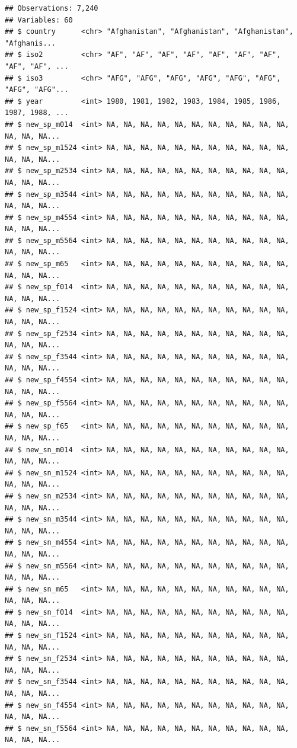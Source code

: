 \documentclass[]{tufte-book}
\begin{document}
\begin{verbatim}
## Observations: 7,240
## Variables: 60
## $ country      <chr> "Afghanistan", "Afghanistan", "Afghanistan", "Afghanis...
## $ iso2         <chr> "AF", "AF", "AF", "AF", "AF", "AF", "AF", "AF", "AF", ...
## $ iso3         <chr> "AFG", "AFG", "AFG", "AFG", "AFG", "AFG", "AFG", "AFG"...
## $ year         <int> 1980, 1981, 1982, 1983, 1984, 1985, 1986, 1987, 1988, ...
## $ new_sp_m014  <int> NA, NA, NA, NA, NA, NA, NA, NA, NA, NA, NA, NA, NA, NA...
## $ new_sp_m1524 <int> NA, NA, NA, NA, NA, NA, NA, NA, NA, NA, NA, NA, NA, NA...
## $ new_sp_m2534 <int> NA, NA, NA, NA, NA, NA, NA, NA, NA, NA, NA, NA, NA, NA...
## $ new_sp_m3544 <int> NA, NA, NA, NA, NA, NA, NA, NA, NA, NA, NA, NA, NA, NA...
## $ new_sp_m4554 <int> NA, NA, NA, NA, NA, NA, NA, NA, NA, NA, NA, NA, NA, NA...
## $ new_sp_m5564 <int> NA, NA, NA, NA, NA, NA, NA, NA, NA, NA, NA, NA, NA, NA...
## $ new_sp_m65   <int> NA, NA, NA, NA, NA, NA, NA, NA, NA, NA, NA, NA, NA, NA...
## $ new_sp_f014  <int> NA, NA, NA, NA, NA, NA, NA, NA, NA, NA, NA, NA, NA, NA...
## $ new_sp_f1524 <int> NA, NA, NA, NA, NA, NA, NA, NA, NA, NA, NA, NA, NA, NA...
## $ new_sp_f2534 <int> NA, NA, NA, NA, NA, NA, NA, NA, NA, NA, NA, NA, NA, NA...
## $ new_sp_f3544 <int> NA, NA, NA, NA, NA, NA, NA, NA, NA, NA, NA, NA, NA, NA...
## $ new_sp_f4554 <int> NA, NA, NA, NA, NA, NA, NA, NA, NA, NA, NA, NA, NA, NA...
## $ new_sp_f5564 <int> NA, NA, NA, NA, NA, NA, NA, NA, NA, NA, NA, NA, NA, NA...
## $ new_sp_f65   <int> NA, NA, NA, NA, NA, NA, NA, NA, NA, NA, NA, NA, NA, NA...
## $ new_sn_m014  <int> NA, NA, NA, NA, NA, NA, NA, NA, NA, NA, NA, NA, NA, NA...
## $ new_sn_m1524 <int> NA, NA, NA, NA, NA, NA, NA, NA, NA, NA, NA, NA, NA, NA...
## $ new_sn_m2534 <int> NA, NA, NA, NA, NA, NA, NA, NA, NA, NA, NA, NA, NA, NA...
## $ new_sn_m3544 <int> NA, NA, NA, NA, NA, NA, NA, NA, NA, NA, NA, NA, NA, NA...
## $ new_sn_m4554 <int> NA, NA, NA, NA, NA, NA, NA, NA, NA, NA, NA, NA, NA, NA...
## $ new_sn_m5564 <int> NA, NA, NA, NA, NA, NA, NA, NA, NA, NA, NA, NA, NA, NA...
## $ new_sn_m65   <int> NA, NA, NA, NA, NA, NA, NA, NA, NA, NA, NA, NA, NA, NA...
## $ new_sn_f014  <int> NA, NA, NA, NA, NA, NA, NA, NA, NA, NA, NA, NA, NA, NA...
## $ new_sn_f1524 <int> NA, NA, NA, NA, NA, NA, NA, NA, NA, NA, NA, NA, NA, NA...
## $ new_sn_f2534 <int> NA, NA, NA, NA, NA, NA, NA, NA, NA, NA, NA, NA, NA, NA...
## $ new_sn_f3544 <int> NA, NA, NA, NA, NA, NA, NA, NA, NA, NA, NA, NA, NA, NA...
## $ new_sn_f4554 <int> NA, NA, NA, NA, NA, NA, NA, NA, NA, NA, NA, NA, NA, NA...
## $ new_sn_f5564 <int> NA, NA, NA, NA, NA, NA, NA, NA, NA, NA, NA, NA, NA, NA...

\end{verbatim}
\end{document}
